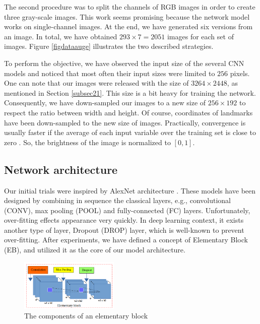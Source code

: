 \documentclass[review]{elsarticle}
\begin{document}
The second procedure was to split the channels of RGB images in order to create three gray-scale images. This work seems promising because the network model works on single-channel images. At the end, we have generated six versions from an image. In total, we have obtained $293 \times 7 = 2051$ images for each set of images. Figure \ref{figdataauge} illustrates the two described strategies.

To perform the objective, we have observed the input size of the several CNN models \cite{krizhevsky2012imagenet, ciregan2012multi, cintas2016automatic, sun2013deep} and noticed that most often their input sizes were limited to $256$ pixels. One can note that our images were released with the size of $3264 \times 2448$, as mentioned in Section \ref{subsec21}. This size is a bit heavy for training the network. Consequently, we have down-sampled our images to a new size of $256 \times 192$ to respect the ratio between width and height. Of course, coordinates of landmarks have been down-sampled to the new size of images. Practically, convergence is usually faster if the average of each input variable over the training set is close to zero \cite{lecun2012efficient}. So, the brightness of the image is normalized to $[0,1]$.%

\subsection{Network architecture}
\label{subsec22}
Our initial trials were inspired by AlexNet architecture \cite{krizhevsky2012imagenet}. These models have been designed by combining in sequence the classical layers, e.g., convolutional (CONV), max pooling (POOL) and fully-connected (FC) layers. Unfortunately, over-fitting effects appearance very quickly. In deep learning context, it exists another type of layer, Dropout (DROP) layer, which is well-known to prevent over-fitting. After experiments, we have defined a concept of Elementary Block (EB), and utilized it as the core of our model architecture.

\begin{figure}[h!]
	\centering
	\includegraphics[width=0.42\textwidth]{images/eblock}
	\caption{The components of an elementary block}
	\label{figeblock}
\end{figure}
\end{document}
